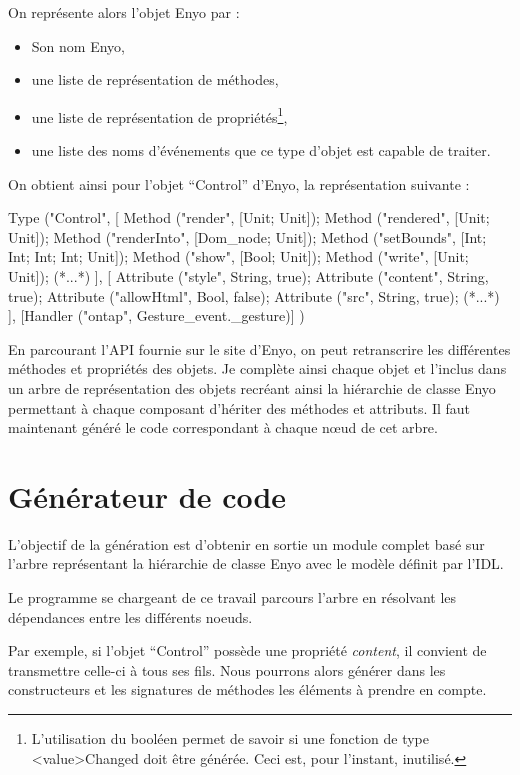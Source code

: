 \documentclass[11pt,a4paper]{report}
\begin{document}
On représente alors l'objet Enyo par :
\begin{itemize}
\item Son nom Enyo,
\item une liste de représentation de méthodes,
\item une liste de représentation de propriétés\footnote{L'utilisation du booléen permet de savoir si 
une fonction de type <value>Changed doit être générée. Ceci est, pour l'instant, inutilisé.},
\item une liste des noms d'événements que ce type d'objet est capable de traiter.
\end{itemize}

On obtient ainsi pour l'objet ``Control'' d'Enyo, la représentation suivante :

\begin{OCaml}
Type ("Control",
      [
	Method ("render", [Unit; Unit]);
	Method ("rendered", [Unit; Unit]);
	Method ("renderInto", [Dom_node; Unit]);
	Method ("setBounds", [Int; Int; Int; Int; Unit]);
	Method ("show", [Bool; Unit]);
	Method ("write", [Unit; Unit]);
        (*...*)
      ],
      [
	Attribute ("style", String, true);
	Attribute ("content", String, true);
	Attribute ("allowHtml", Bool, false);
	Attribute ("src", String, true);
        (*...*)
      ],
      [Handler ("ontap", Gesture_event._gesture)]
)
\end{OCaml}

En parcourant l'API fournie sur le site d'Enyo, on peut retranscrire les différentes méthodes 
et propriétés des objets.
Je complète ainsi chaque objet et l'inclus dans un arbre de représentation des objets recréant 
ainsi la hiérarchie de classe Enyo permettant à chaque composant d'hériter des méthodes et attributs.
Il faut maintenant généré le code correspondant à chaque n\oe{}ud de cet arbre.

\section{Générateur de code}

L'objectif de la génération est d'obtenir en sortie un module complet basé sur l'arbre  
représentant la hiérarchie de classe Enyo avec le modèle définit par l'IDL.

Le programme se chargeant de ce travail parcours l'arbre en résolvant les dépendances
entre les différents noeuds.

Par exemple, si l'objet ``Control'' possède une propriété \emph{content}, il convient
de transmettre celle-ci à tous ses fils.
Nous pourrons alors générer dans les constructeurs et les signatures de méthodes
les éléments à prendre en compte.
\end{document}
